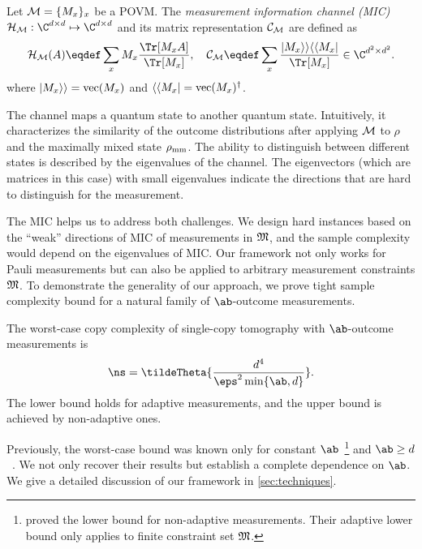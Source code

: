 \begin{definition}
\label{def:mic}
    Let $\mathcal{M}=\{M_x\}_{x}$ be a POVM. The \emph{measurement information channel (MIC)} $\Luders_{\POVM}:\C^{\dims\times\dims}\mapsto\C^{\dims\times\dims}$ and its matrix representation ${\mathcal{C}}_{\mathcal{M}}$ are defined as
\begin{equation}
    \Luders_{\POVM}(A)\eqdef\sum_{x}M_x\frac{\Tr[M_xA]}{\Tr[M_x]}, \quad\Choi_{\POVM}\eqdef \sum_{x}\frac{\vvec{M_x}\vadj{M_x}}{\Tr[M_x]} \in \C^{\dims^2\times\dims^2}.
\end{equation}
where $|M_x\rangle\rangle=\text{vec}(M_x)$ and $\langle\langle M_x|=\text{vec}(M_x)^{\dagger}$.
\end{definition}
The channel maps a quantum state to another quantum state. 
Intuitively, it characterizes the similarity of the outcome distributions after applying $\mathcal{M}$ to $\rho$ and the maximally mixed state ${\rho_{\text{mm}}}$. 
The ability to distinguish between different states is described by the eigenvalues of the channel. The eigenvectors (which are matrices in this case) with small eigenvalues indicate the directions that are hard to distinguish for the measurement. 

The MIC helps us to address both challenges. We design hard instances based on the ``weak'' directions of MIC of measurements in ${\mathfrak{M}}$, 
and the sample complexity would depend on the eigenvalues of MIC.
Our framework not only works for Pauli measurements but can also be applied to arbitrary measurement constraints ${\mathfrak{M}}$. 
To demonstrate the generality of our approach, we prove tight sample complexity bound for a natural family of $\ab$-outcome measurements. 
\begin{theorem} \label{thm:nearly-tight-finite-out}
    The worst-case copy complexity of single-copy tomography with $\ab$-outcome measurements is
    \[
    \ns = \tildeTheta{\frac{\dims^4}{\eps^2\min\{\ab, \dims\}}}.
    \]
    The lower bound holds for adaptive measurements, and the upper bound is achieved by non-adaptive ones.
\end{theorem}
Previously, the worst-case bound was known only for constant $\ab$~\cite{lowe2022lower,Flammia_2012}\footnote{\cite{lowe2022lower} proved the lower bound for non-adaptive measurements. Their adaptive lower bound only applies to finite constraint set ${\mathfrak{M}}$.} and $\ab\ge\dims$~\cite{HaahHJWY17, chen2023does,guctua2020fast}. We not only recover their results but establish a complete dependence on $\ab$. We give a detailed discussion of our framework in \cref{sec:techniques}.


